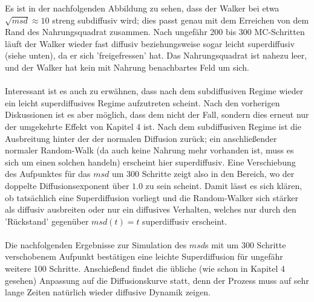 \documentclass[a4paper, 12pt]{report}
\begin{document}
\noindent Es ist in der nachfolgenden Abbildung zu sehen, dass der Walker bei etwa $\sqrt{msd} \approx 10$ streng subdiffusiv wird; dies passt genau mit dem Erreichen von dem Rand des Nahrungsquadrat zusammen. Nach ungefähr 200 bis 300 MC-Schritten läuft der Walker wieder fast diffusiv beziehungsweise sogar leicht superdiffusiv (siehe unten), da er sich 'freigefressen' hat. Das Nahrungsquadrat ist nahezu leer, und der Walker hat kein mit Nahrung benachbartes Feld um sich. 
\\
\\
Interessant ist es auch zu erwähnen, dass nach dem subdiffusiven Regime wieder ein leicht superdiffusives Regime aufzutreten scheint. Nach den vorherigen Diskussionen ist es aber möglich, dass dem nicht der Fall, sondern dies erneut nur der umgekehrte Effekt von Kapitel 4 ist. Nach dem subdiffusiven Regime ist die Ausbreitung hinter der der normalen Diffusion zurück; ein anschließender normaler Random-Walk (da auch keine Nahrung mehr vorhanden ist, muss es sich um einen solchen handeln) erscheint hier superdiffusiv. Eine Verschiebung des Aufpunktes für das $msd$ um 300 Schritte zeigt also in den Bereich, wo der doppelte Diffusionsexponent über $1.0$ zu sein scheint. Damit lässt es sich klären, ob tatsächlich eine Superdiffusion vorliegt und die Random-Walker sich stärker als diffusiv ausbreiten oder nur ein diffusives Verhalten, welches nur durch den 'Rückstand' gegenüber $msd(t)=t$ superdiffusiv erscheint.
\\
\\
\noindent
Die nachfolgenden Ergebnisse zur Simulation des $msd$s mit um 300 Schritte verschobenem Aufpunkt bestätigen eine leichte Superdiffusion für ungefähr weitere 100 Schritte. Anschießend findet die übliche (wie schon in Kapitel 4 gesehen) Anpassung auf die Diffusionskurve statt, denn der Prozess muss auf sehr lange Zeiten natürlich wieder diffusive Dynamik zeigen.
\end{document}
